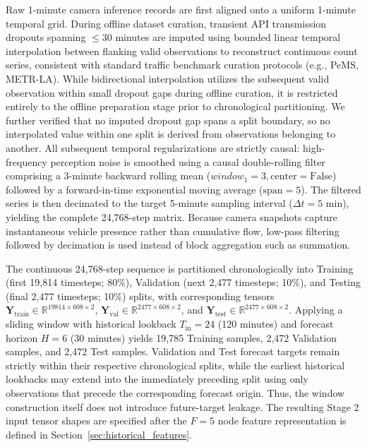 \documentclass[preprint,12pt]{elsarticle}
\begin{document}
Raw 1-minute camera inference records are first aligned onto a uniform 1-minute temporal grid. During offline dataset curation, transient API transmission dropouts spanning $\le 30$ minutes are imputed using bounded linear temporal interpolation between flanking valid observations to reconstruct continuous count series, consistent with standard traffic benchmark curation protocols (e.g., PeMS, METR-LA). While bidirectional interpolation utilizes the subsequent valid observation within small dropout gaps during offline curation, it is restricted entirely to the offline preparation stage prior to chronological partitioning. We further verified that no imputed dropout gap spans a split boundary, so no interpolated value within one split is derived from observations belonging to another. All subsequent temporal regularizations are strictly causal: high-frequency perception noise is smoothed using a causal double-rolling filter comprising a 3-minute backward rolling mean ($window_1=3, \text{center}=\text{False}$) followed by a forward-in-time exponential moving average ($\text{span}=5$). The filtered series is then decimated to the target 5-minute sampling interval ($\Delta t = 5$ min), yielding the complete 24,768-step matrix. Because camera snapshots capture instantaneous vehicle presence rather than cumulative flow, low-pass filtering followed by decimation is used instead of block aggregation such as summation.

The continuous 24,768-step sequence is partitioned chronologically into Training (first 19,814 timesteps; 80\%), Validation (next 2,477 timesteps; 10\%), and Testing (final 2,477 timesteps; 10\%) splits, with corresponding tensors $\mathbf{Y}_{\text{train}} \in \mathbb{R}^{19814 \times 608 \times 2}$, $\mathbf{Y}_{\text{val}} \in \mathbb{R}^{2477 \times 608 \times 2}$, and $\mathbf{Y}_{\text{test}} \in \mathbb{R}^{2477 \times 608 \times 2}$. Applying a sliding window with historical lookback $T_{\text{in}}=24$ (120 minutes) and forecast horizon $H=6$ (30 minutes) yields 19,785 Training samples, 2,472 Validation samples, and 2,472 Test samples. Validation and Test forecast targets remain strictly within their respective chronological splits, while the earliest historical lookbacks may extend into the immediately preceding split using only observations that precede the corresponding forecast origin. Thus, the window construction itself does not introduce future-target leakage. The resulting Stage 2 input tensor shapes are specified after the $F=5$ node feature representation is defined in Section~\ref{sec:historical_features}.
\end{document}

